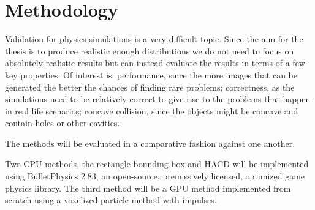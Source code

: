 \section{Methodology}
Validation for physics simulations is a very difficult topic. Since the aim for
the thesis is to produce realistic enough distributions we do not need to focus
on absolutely realistic results but can instead evaluate the results in terms of
a few key properties. Of interest is: performance, since the more images
that can be generated the better the chances of finding rare problems; correctness,
as the simulations need to be relatively correct to give rise to the problems that
 happen in real life scenarios; concave collision, since the objects might
 be concave and contain holes or other cavities.

The methods will be evaluated in a comparative fashion against one another.

Two CPU methods, the rectangle bounding-box and HACD will be implemented using
BulletPhysics 2.83, an open-source, premissively licensed, optimized game physics
library. The third method will be a GPU method implemented from scratch using a
voxelized particle method with impulses.

